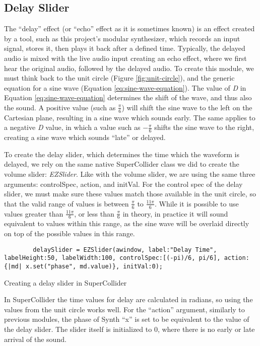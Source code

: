 \subsection{Delay Slider}

The ``delay'' effect (or ``echo'' effect as it is sometimes known) is an effect created by a tool, such as this project's modular synthesizer, which records an input signal, stores it, then plays it back after a defined time. Typically, the delayed audio is mixed with the live audio input creating an echo effect, where we first hear the original audio, followed by the delayed audio. To create this module, we must think back to the unit circle (Figure \ref{fig:unit-circle}), and the generic equation for a sine wave (Equation \ref{eq:sine-wave-equation}). The value of \textit{D} in Equation \ref{eq:sine-wave-equation} determines the shift of the wave, and thus also the sound. A positive value (such as $\frac{\pi}{6}$) will shift the sine wave to the left on the Cartesian plane, resulting in a sine wave which sounds early. The same applies to a negative \textit{D} value, in which a value such as $-\frac{\pi}{6}$ shifts the sine wave to the right, creating a sine wave which sounds ``late'' or delayed.

To create the delay slider, which determines the time which the waveform is delayed, we rely on the same native SuperCollider class we did to create the volume slider: \textit{EZSlider}. Like with the volume slider, we are using the same three arguments: controlSpec, action, and initVal. For the control spec of the delay slider, we must make sure these values match those available in the unit circle, so that the valid range of values is between $\frac{\pi}{6}$ to $\frac{11\pi}{6}$. While it is possible to use values greater than $\frac{11\pi}{6}$, or less than $\frac{\pi}{6}$ in theory, in practice it will sound equivalent to values within this range, as the sine wave will be overlaid directly on top of the possible values in this range. 

\begin{listing}
	\begin{lstlisting}
		delaySlider = EZSlider(awindow, label:"Delay Time", labelHeight:50, labelWidth:100, controlSpec:[(-pi)/6, pi/6], action: {|md| x.set("phase", md.value)}, initVal:0);	
	\end{lstlisting}
	\caption{Creating a delay slider in SuperCollider}
	\label{lst:delay-slider}
\end{listing}

In SuperCollider the time values for delay are calculated in radians, so using the values from the unit circle works well. For the ``action'' argument, similarly to previous modules, the phase of Synth ``x'' is set to be equivalent to the value of the delay slider. The slider itself is initialized to 0, where there is no early or late arrival of the sound.


